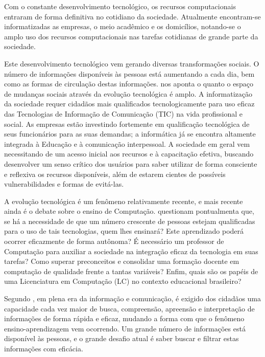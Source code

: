 Com o constante desenvolvimento tecnológico, os recursos computacionais entraram de forma definitiva no cotidiano da sociedade. Atualmente encontram-se informatizadas as empresas, o meio acadêmico e os domicílios, notando-se o amplo uso dos recursos computacionais nas
tarefas cotidianas de grande parte da sociedade. 

Este desenvolvimento tecnológico vem gerando diversas transformações sociais. O número de informações disponíveis às pessoas está aumentando a cada dia, bem como as formas de circulação destas informações. \citep{quim2013} nos aponta o quanto o espaço de mudanças sociais através da evolução tecnológica é amplo. A informatização da sociedade requer cidadãos mais qualificados tecnologicamente para  uso eficaz das Tecnologias de Informação de Comunicação (TIC) na vida profissional e social. As empresas estão investindo fortemente em qualificação tecnológica de seus funcionários para as suas demandas; a informática já se encontra altamente integrada à Educação e à comunicação interpessoal. A sociedade em geral vem necessitando de um acesso inicial aos recursos e à capacitação efetiva, buscando desenvolver um senso crítico dos usuários para saber utilizar de forma consciente e reflexiva os recursos disponíveis, além de estarem cientes de possíveis vulnerabilidades e formas de evitá-las.


A evolução tecnológica é um fenômeno relativamente recente, e mais recente ainda é o debate sobre o ensino de Computação. \citet{castro2013a} questionam pontualmenta que, se há a necessidade de que um número crescente de pessoas estejam qualificadas para o uso de tais tecnologias, quem lhes ensinará? Este aprendizado poderá ocorrer eficazmente de forma autônoma? É necessário um professor de Computação para auxiliar a sociedade na integração eficaz da tecnologia em suas tarefas? Como superar preconceitos e consolidar uma formação docente em computação de qualidade frente a tantas variáveis? Enfim, quais são os papéis de uma Licenciatura em Computação (LC) no 
contexto educacional brasileiro?


Segundo \citet{gatti97}, em plena era da informação e comunicação, é exigido dos cidadãos uma capacidade cada vez maior de busca, compreensão, apreensão e interpretação de informações de forma rápida e eficaz, mudando a forma com que o fenômeno ensino-aprendizagem vem ocorrendo. Um grande número de informações está disponível às pessoas, e o grande desafio atual é saber buscar e filtrar estas informações com eficácia.


